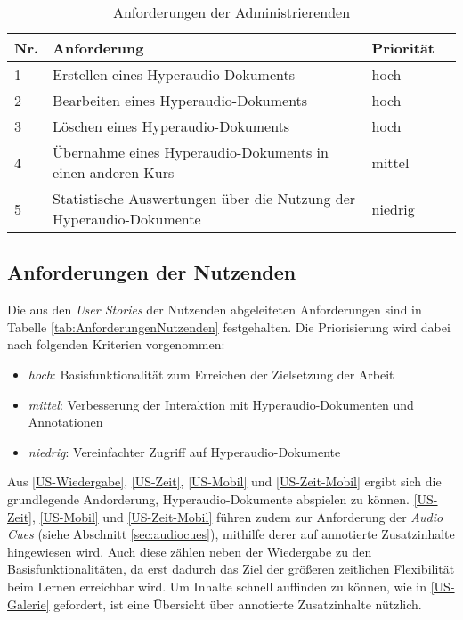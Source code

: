 \begin{table}[!ht]
\def\arraystretch{1.4}
\caption{Anforderungen der Administrierenden}
\label{tab:AnforderungenAdministrierenden}
 \begin{tabularx}{\textwidth}{lXll}      
    \hline
    Nr. & Anforderung & Priorität
    \\\hline
    1 & Erstellen eines Hyperaudio-Dokuments & hoch\\
    2 & Bearbeiten eines Hyperaudio-Dokuments & hoch\\
    3 & Löschen eines Hyperaudio-Dokuments & hoch\\
    4 & Übernahme eines Hyperaudio-Dokuments in einen anderen Kurs & mittel\\
    5 & Statistische Auswertungen über die Nutzung der Hyperaudio-Dokumente & niedrig\\
    \hline
    \end{tabularx}
\end{table}


\subsection{Anforderungen der Nutzenden}
Die aus den \textit{User Stories} der Nutzenden abgeleiteten Anforderungen sind in Tabelle \ref{tab:AnforderungenNutzenden} festgehalten. Die Priorisierung wird dabei nach folgenden Kriterien vorgenommen:

\begin{itemize}
\item \textit{hoch}: Basisfunktionalität zum Erreichen der Zielsetzung der Arbeit
\item \textit{mittel}: Verbesserung der Interaktion mit Hyperaudio-Dokumenten und Annotationen
\item \textit{niedrig}: Vereinfachter Zugriff auf Hyperaudio-Dokumente
\end{itemize}


Aus \ref{US-Wiedergabe}, \ref{US-Zeit}, \ref{US-Mobil} und \ref{US-Zeit-Mobil} ergibt sich die grundlegende Andorderung, Hyperaudio-Dokumente abspielen zu können. \ref{US-Zeit}, \ref{US-Mobil} und \ref{US-Zeit-Mobil} führen zudem zur Anforderung der \textit{Audio Cues} (siehe Abschnitt \ref{sec:audiocues}), mithilfe derer auf annotierte Zusatzinhalte hingewiesen wird. Auch diese zählen neben der Wiedergabe zu den Basisfunktionalitäten, da erst dadurch das Ziel der größeren zeitlichen Flexibilität beim Lernen erreichbar wird. Um Inhalte schnell auffinden zu können, wie in \ref{US-Galerie} gefordert, ist eine Übersicht über annotierte Zusatzinhalte nützlich.

